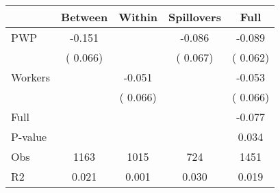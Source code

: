 
\begin{tabular}{l*{4}{c}}\hline&\multicolumn{1}{c}{Between}&\multicolumn{1}{c}{Within}&\multicolumn{1}{c}{Spillovers}&\multicolumn{1}{c}{Full}\\ \hline
 PWP           &             -0.151      &                                               &       -0.086 &        -0.089                            \\ 
                               &        (       0.066)           &                                       &       (       0.067)     &      (       0.062)                                           \\ 
 Workers       &                                               &       -0.051    &                                &            -0.053                            \\ 
                               &                                               & (       0.066)                  &                                        &      (       0.066)                                           \\ 
\hline                                                                                                                                                                                                                                            
 Full                  &                                               &                                               &                                        &            -0.077                                     \\ 
 P-value               &                                               &                                               &                                        &             0.034                                           \\ 
 Obs                   &               1163               &       1015                       &       724                &              1451                                               \\ 
 R2                    &                      0.021              &              0.001                      &              0.030               &                     0.019                                              \\ 
\hline \end{tabular}                                                                                                                                                                                                              